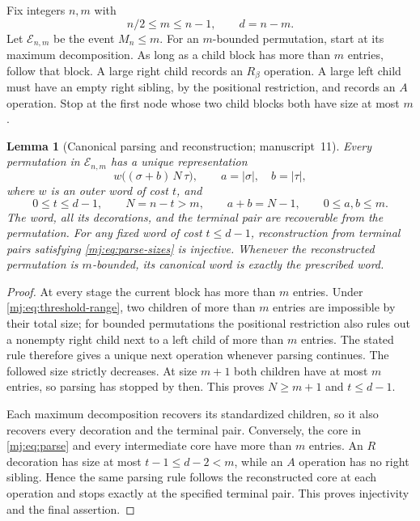 \documentclass[11pt,a4paper]{article}
\newtheorem{lemma}[lemma]{Lemma}
\theoremstyle{definition}\newaliascnt{definition}{theorem}
\theoremstyle{remark}\newaliascnt{remark}{theorem}
\begin{document}
Fix integers $n,m$ with
\begin{equation}
 n/2\le m\le n-1,\qquad d=n-m.
 \label{mj:eq:threshold-range}
\end{equation}
Let $\mathcal E_{n,m}$ be the event $M_n\le m$. For an $m$-bounded
permutation, start at its maximum decomposition. As long as a child block
has more than $m$ entries, follow that block. A large right child records an
$R_\beta$ operation. A large left child must have an empty right sibling, by
the positional restriction, and records an $A$ operation. Stop at the first
node whose two child blocks both have size at most $m$.

\begin{lemma}[Canonical parsing and reconstruction; manuscript~11]
\label{mj:lem:parse}
Every permutation in $\mathcal E_{n,m}$ has a unique representation
\begin{equation}
 w\bigl((\sigma+b)\,N\,\tau\bigr),
 \qquad a=|\sigma|,\quad b=|\tau|,
 \label{mj:eq:parse}
\end{equation}
where $w$ is an outer word of cost $t$, and
\begin{equation}
 0\le t\le d-1,\qquad N=n-t>m,
 \qquad a+b=N-1,\qquad 0\le a,b\le m.
 \label{mj:eq:parse-sizes}
\end{equation}
The word, all its decorations, and the terminal pair are recoverable from
the permutation. For any fixed word of cost $t\le d-1$, reconstruction from
terminal pairs satisfying \eqref{mj:eq:parse-sizes} is injective. Whenever
the reconstructed permutation is $m$-bounded, its canonical word is exactly
the prescribed word.
\end{lemma}
\begin{proof}
At every stage the current block has more than $m$ entries. Under
\eqref{mj:eq:threshold-range}, two children of more than $m$ entries are
impossible by their total size; for bounded permutations the positional
restriction also rules out a nonempty right child next to a left child of
more than $m$ entries. The stated rule therefore gives a unique next
operation whenever parsing continues. The followed size strictly decreases.
At size $m+1$ both children have at most $m$ entries, so parsing has stopped
by then. This proves $N\ge m+1$ and $t\le d-1$.

Each maximum decomposition recovers its standardized children, so it also
recovers every decoration and the terminal pair. Conversely, the core in
\eqref{mj:eq:parse} and every intermediate core have more than $m$ entries.
An $R$ decoration has size at most $t-1\le d-2<m$, while an $A$ operation has
no right sibling. Hence the same parsing rule follows the reconstructed core
at each operation and stops exactly at the specified terminal pair. This
proves injectivity and the final assertion.
\end{proof}
\end{document}

